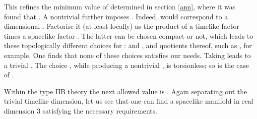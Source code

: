 \documentclass[a4paper,a4paper]{article}
\begin{document}
This refines the minimum value of \coordHE{} determined in section \ref{ann}, 
where it was found that \coordHE{}. A nontrivial \coordHE{} further 
imposes \coordHE{}. Indeed, \coordHE{} would correspond to a \coordHE{} dimensional \coordHE{}.
Factorise it (at least locally) as the product of a timelike factor \coordHE{} 
times a spacelike factor \coordHE{}. The latter can be chosen compact 
or not, which leads to these topologically different choices for \coordHE{}: 
\coordHE{} and \coordHE{}, and quotients thereof, such as \coordHE{}, for 
example. One finds that none of these choices satisfies our needs.
Taking \coordHE{} leads to a trivial \coordHE{}.
The choice \coordHE{}, while producing a nontrivial \coordHE{}, 
is torsionless; so is the case of \coordHE{}.

Within the type IIB theory the next allowed value is \coordHE{}. 
Again separating out the trivial timelike dimension, let us see 
that one can find a spacelike manifold \coordHE{} in real dimension 3
satisfying the necessary requirements.
\end{document}
